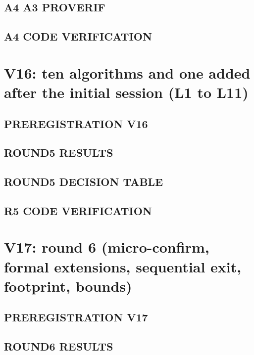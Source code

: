 \documentclass[10pt,a4paper]{article}
\begin{document}
\subsection{A4 A3 PROVERIF}


\subsection{A4 CODE VERIFICATION}


\section{V16: ten algorithms and one added after the initial session (L1 to L11)}

\subsection{PREREGISTRATION V16}


\subsection{ROUND5 RESULTS}


\subsection{ROUND5 DECISION TABLE}


\subsection{R5 CODE VERIFICATION}


\section{V17: round 6 (micro-confirm, formal extensions, sequential exit, footprint, bounds)}

\subsection{PREREGISTRATION V17}


\subsection{ROUND6 RESULTS}

\end{document}
